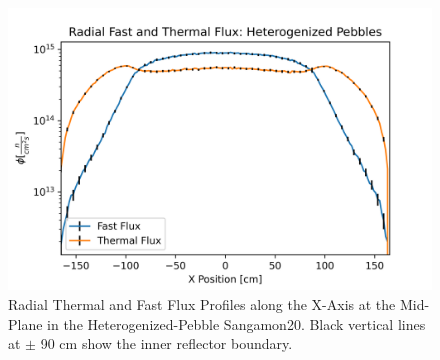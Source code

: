 \begin{figure}[H]
\centering

\includegraphics[width=0.95\linewidth]{figures/fast_therm_flux_het_er.png}

\caption{Radial Thermal and Fast Flux Profiles along the X-Axis at the Mid-Plane in the Heterogenized-Pebble Sangamon20.  Black vertical lines at $\pm$ 90 cm show the inner reflector boundary.}
\label{fig:het-det-xy}
\end{figure}